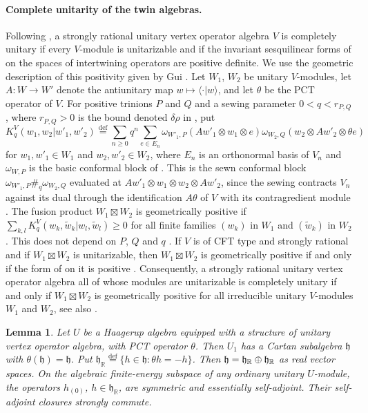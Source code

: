 \documentclass[leqno]{article}
\newcommand{\R}{\ensuremath{\mathbb{R}}}
\renewcommand{\geq}{\ensuremath{\geqslant}}
\newcommand{\co}{\colon}
\newcommand{\ot}{\otimes}
\let\i\relax %
\newcommand{\i}{\mathrm{i}}
\newcommand{\ov}{\overset}
\newtheorem{lemma}[thm]{Lemma}
\numberwithin{equation}{section}
\begin{document}
\paragraph{Complete unitarity of the twin algebras.} Following \cite[Definition 1.8 p.~13]{Gui22}, a strongly rational unitary vertex operator algebra $V$ is completely unitary if every $V$-module is unitarizable and if the invariant sesquilinear forms of \cite[Section 6.2 p.~36]{Gui19} on the spaces of intertwining operators are positive definite. We use the geometric description of this positivity given by Gui \cite{Gui24}. Let $W_1$, $W_2$ be unitary $V$-modules, let $A \co W \to W'$ denote the antiunitary map $w \mapsto \langle \cdot | w\rangle$, and let $\theta$ be the PCT operator of $V$. For positive trinions $P$ and $Q$ and a sewing parameter $0 < q < r_{P,Q}$, where $r_{P,Q} > 0$ is the bound denoted $\delta\rho$ in \cite[Section 7.1 p.~43]{Gui24}, put
\begin{equation}
\label{eq:geometric-kernel}
K^V_q(w_1,w_2  |  w'_1,w'_2) \ov{\mathrm{def}}{=} \sum_{n \geq 0} q^n \sum_{e \in E_n} \omega_{W'_1,P}(Aw'_1 \ot w_1 \ot e) \omega_{W_2,Q}(w_2 \ot Aw'_2 \ot \theta e)
\end{equation}
for $w_1,w'_1 \in W_1$ and $w_2,w'_2 \in W_2$, where $E_n$ is an orthonormal basis of $V_n$ and $\omega_{W,P}$ is the basic conformal block of \cite[Theorem 6.11 p.~40]{Gui24}. This is the sewn conformal block $\omega_{W'_1,P} \#_q \omega_{W_2,Q}$ evaluated at $Aw'_1 \ot w_1 \ot w_2 \ot Aw'_2$, since the sewing contracts $V_n$ against its dual through the identification $A\theta$ of $V$ with its contragredient module \cite[Definition 3.4 p.~23 and (6.1e) p.~37]{Gui24}. The fusion product $W_1 \boxtimes W_2$ is geometrically positive if $\sum_{k,l} K^V_q(w_k,\tilde w_k  |  w_l,\tilde w_l) \geq 0$ for all finite families $(w_k)$ in $W_1$ and $(\tilde w_k)$ in $W_2$. This does not depend on $P$, $Q$ and $q$ \cite[Lemma 7.2 p.~44]{Gui24}. If $V$ is of CFT type and strongly rational and if $W_1 \boxtimes W_2$ is unitarizable, then $W_1 \boxtimes W_2$ is geometrically positive if and only if the form of \cite{Gui19} on it is positive \cite[Corollary 8.4 p.~53]{Gui24}. Consequently, a strongly rational unitary vertex operator algebra all of whose modules are unitarizable is completely unitary if and only if $W_1 \boxtimes W_2$ is geometrically positive for all irreducible unitary $V$-modules $W_1$ and $W_2$, see also \cite[p.~47]{Gui24}.

\begin{lemma}
\label{lem:stable-cartan}
Let $U$ be a Haagerup algebra equipped with a structure of unitary vertex operator algebra, with PCT operator $\theta$. Then $U_1$ has a Cartan subalgebra $\mathfrak h$ with $\theta(\mathfrak h) = \mathfrak h$. Put $\mathfrak h_{\R} \ov{\mathrm{def}}{=} \{h \in \mathfrak h : \theta h = -h\}$. Then $\mathfrak h = \mathfrak h_{\R} \oplus \i\mathfrak h_{\R}$ as real vector spaces. On the algebraic finite-energy subspace of any ordinary unitary $U$-module, the operators $h_{(0)}$, $h \in \mathfrak h_{\R}$, are symmetric and essentially self-adjoint. Their self-adjoint closures strongly commute.
\end{lemma}
\end{document}
